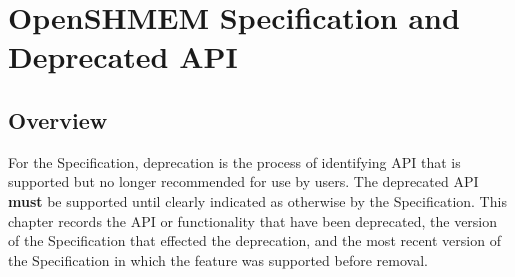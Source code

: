 \chapter{OpenSHMEM Specification and Deprecated API}\label{sec:dep_api}

\section{Overview}\label{subsec:dep_overview}
For the \openshmem Specification, deprecation is the process of identifying
API that is supported but no longer recommended for use by users.
The deprecated API \textbf{must} be supported until clearly
indicated as otherwise by the Specification.
This chapter records the API or functionality that have been deprecated, the
version of the \openshmem Specification that effected the deprecation, and the
most recent version of the \openshmem Specification in which the feature was
supported before removal.

